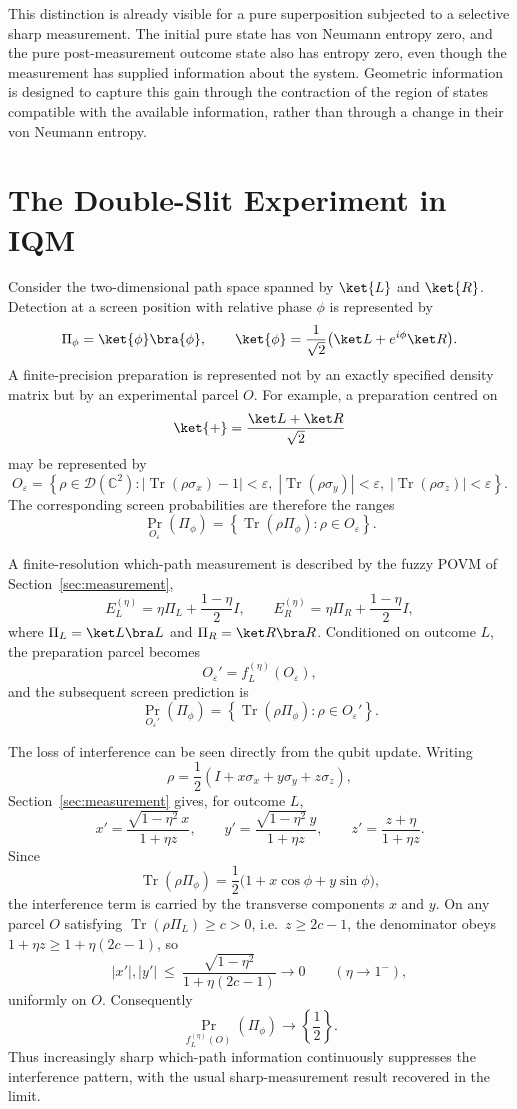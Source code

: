 \documentclass[11pt, onecolumn]{article}
\begin{document}
This distinction is already visible for a pure superposition subjected to
a selective sharp measurement. The initial pure state has von Neumann
entropy zero, and the pure post-measurement outcome state also has entropy
zero, even though the measurement has supplied information about the
system. Geometric information is designed to capture this gain through
the contraction of the region of states compatible with the available
information, rather than through a change in their von Neumann entropy.
\section{The Double-Slit Experiment in IQM}
\label{sec:double-slit}

Consider the two-dimensional path space spanned by $\ket{L}$ and $\ket{R}$.
Detection at a screen position with relative phase $\phi$ is represented by
\[
\Pi_\phi=\ket{\phi}\bra{\phi},
\qquad
\ket{\phi}
=
\frac{1}{\sqrt2}
\bigl(\ket L+e^{i\phi}\ket R\bigr).
\]
A finite-precision preparation is represented not by an exactly specified
density matrix but by an experimental parcel $O$.  For example, a preparation
centred on
\[
\ket{+}=\frac{\ket L+\ket R}{\sqrt2}
\]
may be represented by
\[
O_\varepsilon
=
\left\{
\rho\in\mathcal D(\mathbb C^2):
|\operatorname{Tr}(\rho\sigma_x)-1|<\varepsilon,\;
|\operatorname{Tr}(\rho\sigma_y)|<\varepsilon,\;
|\operatorname{Tr}(\rho\sigma_z)|<\varepsilon
\right\}.
\]
The corresponding screen probabilities are therefore the ranges
\[
\Pr_{O_\varepsilon}(\Pi_\phi)
=
\left\{
\operatorname{Tr}(\rho\Pi_\phi):
\rho\in O_\varepsilon
\right\}.
\]

A finite-resolution which-path measurement is described by the fuzzy POVM
of Section~\ref{sec:measurement},
\[
E_L^{(\eta)}
=
\eta\Pi_L+\frac{1-\eta}{2}I,
\qquad
E_R^{(\eta)}
=
\eta\Pi_R+\frac{1-\eta}{2}I,
\]
where $\Pi_L=\ket L\bra L$ and $\Pi_R=\ket R\bra R$.
Conditioned on outcome $L$, the preparation parcel becomes
\[
O_\varepsilon'
=
f_L^{(\eta)}(O_\varepsilon),
\]
and the subsequent screen prediction is
\[
\Pr_{O_\varepsilon'}(\Pi_\phi)
=
\left\{
\operatorname{Tr}(\rho\Pi_\phi):
\rho\in O_\varepsilon'
\right\}.
\]

The loss of interference can be seen directly from the qubit update.
Writing
\[
\rho=\frac12(I+x\sigma_x+y\sigma_y+z\sigma_z),
\]
Section~\ref{sec:measurement} gives, for outcome $L$,
\[
x'
=
\frac{\sqrt{1-\eta^2}\,x}{1+\eta z},
\qquad
y'
=
\frac{\sqrt{1-\eta^2}\,y}{1+\eta z},
\qquad
z'
=
\frac{z+\eta}{1+\eta z}.
\]
Since
\[
\operatorname{Tr}(\rho\Pi_\phi)
=
\frac12\bigl(1+x\cos\phi+y\sin\phi\bigr),
\]
the interference term is carried by the transverse components $x$ and $y$. On any parcel $O$ satisfying $\operatorname{Tr}(\rho\Pi_L)\ge c>0$, i.e.\ $z\ge2c-1$, the denominator obeys $1+\eta z\ge1+\eta(2c-1)$, so
\[
|x'|,|y'|
\ \le\
\frac{\sqrt{1-\eta^2}}{1+\eta(2c-1)}
\longrightarrow0
\qquad(\eta\to1^-),
\]
uniformly on $O$. Consequently
\[
\Pr_{f_L^{(\eta)}(O)}(\Pi_\phi)
\longrightarrow
\left\{\frac12\right\}.
\]
Thus increasingly sharp which-path information continuously suppresses the
interference pattern, with the usual sharp-measurement result recovered in
the limit.
\end{document}

